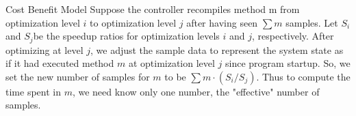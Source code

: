 \begin{section}{Cost Benefit Model}
Suppose the controller recompiles method m from optimization level $i$ to optimization level $j$ after having seen $\sum m$ samples. Let $S_i$ and $S_j $be the speedup ratios for optimization levels $i$ and $j$, respectively. After optimizing at level $j$, we adjust the sample data to represent the system state as if it had executed method $m$ at optimization level $j$ since program startup. So, we set the new number of samples for $m$ to be $\sum m \cdot (S_i/S_j)$. Thus to compute the time spent in $m$, we need know only one number, the "effective" number of samples.
\end{section}
